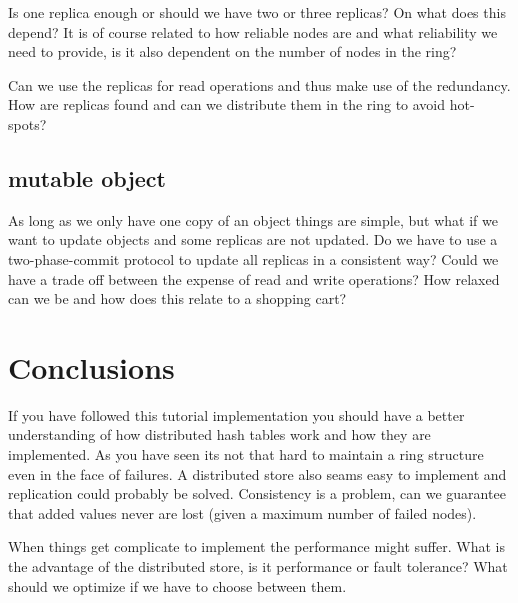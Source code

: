 \documentclass[a4paper,11pt]{article}
\begin{document}
Is one replica enough or should we have two or three replicas? On what
does this depend? It is of course related to how reliable nodes are
and what reliability we need to provide, is it also dependent on the
number of nodes in the ring?

Can we use the replicas for read operations and thus make use of the
redundancy. How are replicas found and can we distribute them in the
ring to avoid hot-spots?

\subsection{mutable object}

As long as we only have one copy of an object things are simple, but
what if we want to update objects and some replicas are not
updated. Do we have to use a two-phase-commit protocol to update all
replicas in a consistent way? Could we have a trade off between the
expense of read and write operations? How relaxed can we be and how
does this relate to a shopping cart?

\section{Conclusions}

If you have followed this tutorial implementation you should have a
better understanding of how distributed hash tables work and how they
are implemented. As you have seen its not that hard to maintain a ring
structure even in the face of failures. A distributed store also seams
easy to implement and replication could probably be
solved. Consistency is a problem, can we guarantee that added values
never are lost (given a maximum number of failed nodes). 

When things get complicate to implement the performance might
suffer. What is the advantage of the distributed store, is it
performance or fault tolerance? What should we optimize if we have to
choose between them.
\end{document}
